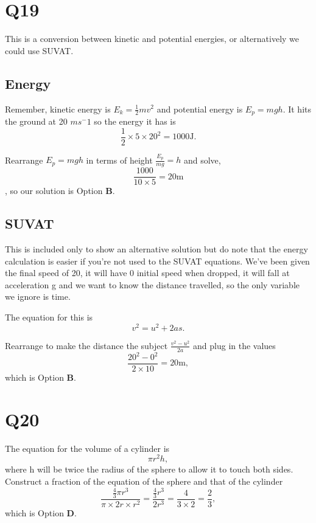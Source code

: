\documentclass[11pt]{article}
\begin{document}
\section*{Q19}
This is a conversion between kinetic and potential energies, or alternatively we could use SUVAT.

\subsection*{Energy}
Remember, kinetic energy is $E_k = \frac{1}{2}mv^2$ and potential energy is $E_p = mgh$.  It hits the ground at 20 $ms^-1$ so the energy it has is 
\begin{equation*}
\frac{1}{2} \times 5 \times 20^2 = 1000 \mathrm{J}.
\end{equation*}

Rearrange $E_p=mgh$ in terms of height $\frac{E_p}{mg} = h$ and solve,
\begin{equation*}
\frac{1000}{10\times 5} = 20 \mathrm{m}
\end{equation*},
so our solution is Option \textbf{B}.

\subsection*{SUVAT}
This is included only to show an alternative solution but do note that the energy calculation is easier if you're not used to the SUVAT equations.
We've been given the final speed of 20, it will have 0 initial speed when dropped, it will fall at acceleration g and we want to know the distance travelled, so the only variable we ignore is time.

The equation for this is
\begin{equation*}
v^2 = u^2 + 2as.
\end{equation*}

Rearrange to make the distance the subject $\frac{v^2-u^2}{2a}$ and plug in the values
\begin{equation*}
\frac{20^2 -0^2}{2\times 10} = 20 \mathrm{m},
\end{equation*}
which is Option \textbf{B}.

\section*{Q20}
The equation for the volume of a cylinder is
\begin{equation*}
\pi r^2h, 
\end{equation*}
where h will be twice the radius of the sphere to allow it to touch both sides.  Construct a fraction of the equation of the sphere and that of the cylinder
\begin{equation*}
\frac{\frac{4}{3}\pi r^3}{\pi \times 2r \times r^2} = \frac{\frac{4}{3} r^3}{2r^3} = \frac{4}{3\times2} = \frac{2}{3}, 
\end{equation*}
which is Option \textbf{D}.
\end{document}
